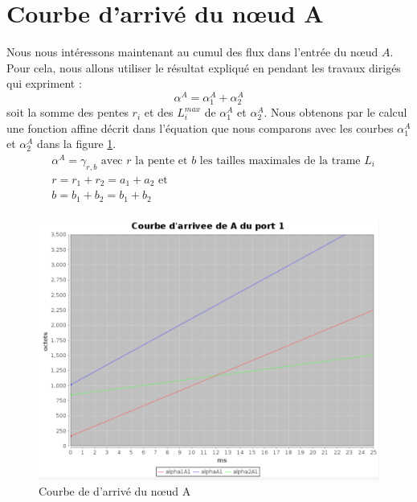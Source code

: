 \section{Courbe d'arrivé du nœud A}
Nous nous intéressons maintenant au cumul des flux dans l'entrée du nœud $A$. Pour cela, nous allons utiliser le résultat expliqué en pendant les travaux dirigés qui expriment : 
\begin{equation}
\alpha^A = \alpha_1^A + \alpha_2^A
\end{equation}
soit la somme des pentes $r_i$ et des $L_i^{max}$ de $\alpha_1^A$ et $\alpha_2^A$. Nous obtenons par le calcul une fonction affine décrit dans l'équation  que nous comparons avec les courbes $\alpha_1^A$ et $\alpha_2^A$ dans la figure \ref{fig:arriveA}.
\begin{align}\label{eqn:arriveA}
&\alpha^A = \gamma_{r,b} \text{ avec $r$ la pente et $b$ les tailles maximales de la trame $L_i$}\\
&r = r_1 + r_2 = a_1 + a_2\text{ et } \\
&b = b_1 + b_2 = b_1 + b_2\\
\end{align}
\begin{figure}[!ht]\label{fig:arriveA}
\centering
\includegraphics[width = .6\textwidth]{./I/images/arrive_general.png}
\caption{Courbe de d'arrivé du nœud A}
\end{figure} 